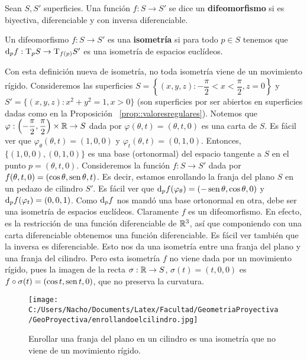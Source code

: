 \begin{defn}
Sean $S,S'$ superficies. Una función $f:S\to S'$ se dice un \textbf{difeomorfismo} si es biyectiva, diferenciable y con inversa diferenciable.
\end{defn}

\begin{defn}
Un difeomorfismo $f:S\to S'$ es una \textbf{isometría} si para todo $p\in S$ tenemos que $\mathop{}\!\mathrm{d}_pf:\mathrm{T}_pS\to\mathrm{T}_{f(p)}S'$ es una isometría de espacios euclídeos.
\end{defn}

\begin{obs}
Con esta definición nueva de isometría, no toda isometría viene de un movimiento rígido. Consideremos las superficies $S=\left\{(x,y,z):-\dfrac{\pi}{2}<x<\dfrac{\pi}{2}, z=0\right\}$ y $S'=\{(x,y,z):x^2+y^2 = 1, x>0\}$ (son superficies por ser abiertos en superficies dadas como en la Proposición ~\ref{prop::valoresregulares}). Notemos que $\varphi:\left(-\dfrac{\pi}{2},\dfrac{\pi}{2}\right)\times\mathbb{R}\to S$ dada por $\varphi(\theta,t)=(\theta,t,0)$ es una carta de $S$. Es fácil ver que $\varphi_\theta(\theta,t)=(1,0,0)$ y $\varphi_t(\theta,t)=(0,1,0)$. Entonces, $\{(1,0,0),(0,1,0)\}$ es una base (ortonormal) del espacio tangente a $S$ en el punto $p=(\theta,t,0)$. Consideremos la función $f:S\to S'$ dada por $f(\theta,t,0) = (\cos\theta,\operatorname{sen}\theta,t)$. Es decir, estamos enrollando la franja del plano $S$ en un pedazo de cilindro $S'$. Es fácil ver que $\mathop{}\!\mathrm{d}_p f(\varphi_\theta)=(-\operatorname{sen}\theta,\cos\theta,0)$ y $\mathop{}\!\mathrm{d}_p f(\varphi_t)=(0,0,1)$. Como $\mathop{}\!\mathrm{d}_p f$ nos mandó una base ortonormal en otra, debe ser una isometría de espacios euclídeos. Claramente $f$ es un difeomorfismo. En efecto, es la restricción de una función diferenciable de $\mathbb{R}^3$, así que componiendo con una carta diferenciable obtenemos una función diferenciable. Es fácil ver también que la inversa es diferenciable. Esto nos da una isometría entre una franja del plano y una franja del cilindro. Pero esta isometría $f$ no viene dada por un movimiento rígido, pues la imagen de la recta $\sigma:\mathbb{R}\to S$, $\sigma(t)=(t,0,0)$ es $f\circ\sigma(t)=(\cos t,\operatorname{sen} t,0)$, que no preserva la curvatura.

\begin{figure}[h]
	\centering
		\texttt{[image: C:/Users/Nacho/Documents/Latex/Facultad/GeometriaProyectiva/GeoProyectiva/enrollandoelcilindro.jpg]}
	\caption{Enrollar una franja del plano en un cilindro es una isometría que no viene de un movimiento rígido.}
	\label{fig:enrollandoelcilindro}
\end{figure}
\end{obs}

